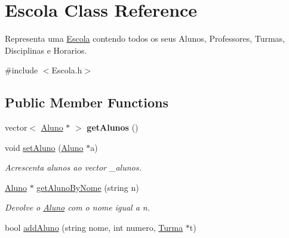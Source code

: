 \hypertarget{class_escola}{\section{Escola Class Reference}
\label{class_escola}
}


Representa uma \hyperlink{class_escola}{Escola} contendo todos os seus Alunos, Professores, Turmas, Disciplinas e Horarios.  




{\ttfamily \#include $<$Escola.\-h$>$}

\subsection*{Public Member Functions}
\begin{DoxyCompactItemize}
\item 
\hypertarget{class_escola_a881727d5171216be19d3e63cf95e2110}{vector$<$ \hyperlink{class_aluno}{Aluno} $\ast$ $>$ {\bfseries get\-Alunos} ()}\label{class_escola_a881727d5171216be19d3e63cf95e2110}

\item 
\hypertarget{class_escola_a56f72e713a433a9b63086df24de6985a}{void \hyperlink{class_escola_a56f72e713a433a9b63086df24de6985a}{set\-Aluno} (\hyperlink{class_aluno}{Aluno} $\ast$a)}\label{class_escola_a56f72e713a433a9b63086df24de6985a}

\begin{DoxyCompactList}\small\item\em Acrescenta alunos ao vector \-\_\-alunos. \end{DoxyCompactList}\item 
\hypertarget{class_escola_a7582a678219ca0977bab1ac1db1109f2}{\hyperlink{class_aluno}{Aluno} $\ast$ \hyperlink{class_escola_a7582a678219ca0977bab1ac1db1109f2}{get\-Aluno\-By\-Nome} (string n)}\label{class_escola_a7582a678219ca0977bab1ac1db1109f2}

\begin{DoxyCompactList}\small\item\em Devolve o \hyperlink{class_aluno}{Aluno} com o nome igual a n. \end{DoxyCompactList}\item 
\hypertarget{class_escola_ab8911a8daa03ac6172defbcb68710b06}{bool \hyperlink{class_escola_ab8911a8daa03ac6172defbcb68710b06}{add\-Aluno} (string nome, int numero, \hyperlink{class_turma}{Turma} $\ast$t)}\label{class_escola_ab8911a8daa03ac6172defbcb68710b06}


\end{DoxyCompactItemize}

